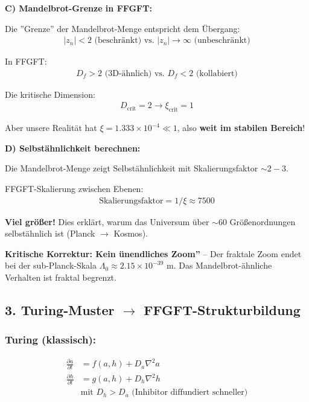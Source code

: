 	\textbf{C) Mandelbrot-Grenze in FFGFT:}
	
	Die ''Grenze'' der Mandelbrot-Menge entspricht dem Übergang:
	\begin{align*}
		|z_n| < 2 \text{ (beschränkt) vs. } |z_n| \to \infty \text{ (unbeschränkt)}
	\end{align*}
	
	In FFGFT:
	\begin{align*}
		D_f > 2 \text{ (3D-ähnlich) vs. } D_f < 2 \text{ (kollabiert)}
	\end{align*}
	
	Die kritische Dimension:
	\begin{align*}
		D_{\text{crit}} = 2 \rightarrow \xi_{\text{crit}} = 1
	\end{align*}
	
	Aber unsere Realität hat $\xi = 1.333 \times 10^{-4} \ll 1$, also \textbf{weit im stabilen Bereich}!
	
	\textbf{D) Selbstähnlichkeit berechnen:}
	
	Die Mandelbrot-Menge zeigt Selbstähnlichkeit mit Skalierungsfaktor $\sim 2-3$.
	
	FFGFT-Skalierung zwischen Ebenen:
	\begin{align*}
		\text{Skalierungsfaktor} = 1/\xi \approx 7500
	\end{align*}
	
	\textbf{Viel größer!} Dies erklärt, warum das Universum über $\sim 60$ Größenordnungen selbstähnlich ist (Planck $\to$ Kosmos).
	
	\textbf{Kritische Korrektur: Kein ünendliches Zoom''} – Der fraktale Zoom endet bei der sub-Planck-Skala $\Lambda_0 \approx 2.15 \times 10^{-39}$ m. Das Mandelbrot-ähnliche Verhalten ist fraktal begrenzt.
	
	\subsection*{3. Turing-Muster $\rightarrow$ FFGFT-Strukturbildung}
	
	\subsubsection*{Turing (klassisch):}
	\begin{align*}
		\frac{\partial a}{\partial t} &= f(a,h) + D_a \nabla^2 a \\
		\frac{\partial h}{\partial t} &= g(a,h) + D_h \nabla^2 h \\
		&\text{mit } D_h > D_a \text{ (Inhibitor diffundiert schneller)}
	\end{align*}
	
